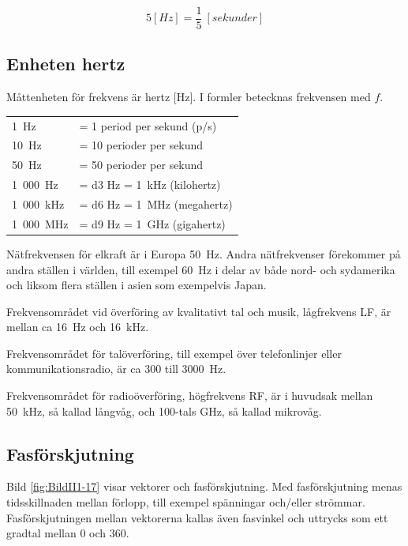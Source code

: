 \[5 [\unit{Hz}] = \dfrac{1}{5}\ [\unit{sekunder}]\]

\subsection{Enheten hertz}


Måttenheten för frekvens är hertz [Hz].
I formler betecknas frekvensen med \(f\).

\begin{center}
  \begin{tabular}{ll}
		1~Hz      & =  \num{1} period per sekund (p/s) \\
		10~Hz     & = \num{10} perioder per sekund \\
		50~Hz     & = \num{50} perioder per sekund \\
		1~000~Hz  & = \num{d3} Hz = 1~kHz (kilohertz) \\
		1~000~kHz & = \num{d6} Hz = 1~MHz (megahertz) \\
		1~000~MHz & = \num{d9} Hz = 1~GHz (gigahertz) \\
	\end{tabular}
\end{center}

Nätfrekvensen för elkraft är i Europa \SI{50}{\hertz}.
Andra nätfrekvenser förekommer på andra ställen i världen, till exempel \SI{60}{\hertz} i delar av både nord- och sydamerika och liksom flera ställen i asien som exempelvis Japan.

Frekvensområdet vid överföring av kvalitativt tal och musik, lågfrekvens LF, är
mellan ca \SI{16}{Hz} och \SI{16}{kHz}.

Frekvensområdet för talöverföring, till exempel över telefonlinjer eller
kommunikationsradio, är ca \num{300} till \SI{3000}{\hertz}.

Frekvensområdet för radioöverföring, högfrekvens RF, är i huvudsak mellan
\SI{50}{kHz}, så kallad långvåg, och 100-tals \unit{GHz}, så kallad mikrovåg.

\subsection{Fasförskjutning}
Bild \ref{fig:BildII1-17} visar vektorer och fasförskjutning.
Med fasförskjutning menas tidsskillnaden mellan förlopp, till exempel spänningar
och/eller strömmar.
Fasförskjutningen mellan vektorerna kallas även fasvinkel och uttrycks som ett
gradtal mellan 0 och 360\degree.

